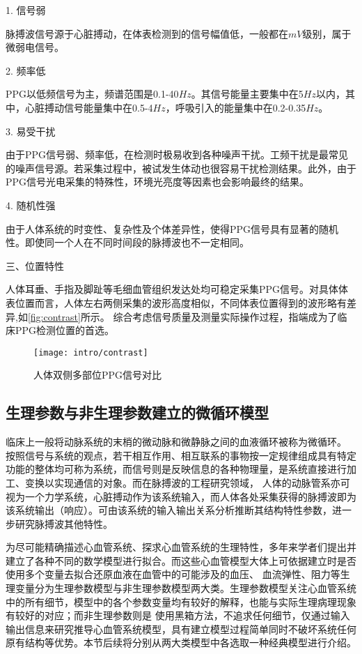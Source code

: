 1. 信号弱

脉搏波信号源于心脏搏动，在体表检测到的信号幅值低，一般都在$mV$级别，属于微弱电信号。

2. 频率低

PPG以低频信号为主，频谱范围是0.1-40$Hz$。其信号能量主要集中在5$Hz$以内，其中，心脏搏动信号能量集中在0.5-4$Hz$，呼吸引入的能量集中在0.2-0.35$Hz$。

3. 易受干扰

由于PPG信号弱、频率低，在检测时极易收到各种噪声干扰。工频干扰是最常见的噪声信号源。若采集过程中，被试发生体动也很容易干扰检测结果。此外，由于PPG信号光电采集的特殊性，环境光亮度等因素也会影响最终的结果。

4. 随机性强

由于人体系统的时变性、复杂性及个体差异性，使得PPG信号具有显著的随机性。即使同一个人在不同时间段的脉搏波也不一定相同。

三、位置特性

人体耳垂、手指及脚趾等毛细血管组织发达处均可稳定采集PPG信号。对具体体表位置而言，人体左右两侧采集的波形高度相似，不同体表位置得到的波形略有差异\cite{Allen2000,Allen2007},如\autoref{fig:contrast}所示。
综合考虑信号质量及测量实际操作过程，指端成为了临床PPG检测位置的首选\cite{cwl}。
\begin{figure}[htbp]
    \centering
    \texttt{[image: intro/contrast]}
    \caption{\label{fig:contrast}人体双侧多部位PPG信号对比}
\end{figure}

\subsection{生理参数与非生理参数建立的微循环模型}
临床上一般将动脉系统的末梢的微动脉和微静脉之间的血液循环被称为微循环\cite{Abraham2011,John2004}。
按照信号与系统的观点，若干相互作用、相互联系的事物按一定规律组成具有特定功能的整体均可称为系统，而信号则是反映信息的各种物理量，是系统直接进行加工、变换以实现通信的对象\cite{Alan2019}。而在脉搏波的工程研究领域，
人体的动脉管系亦可视为一个力学系统，心脏搏动作为该系统输入，而人体各处采集获得的脉搏波即为该系统输出（响应）。可由该系统的输入输出关系分析推断其结构特性参数，进一步研究脉搏波其他特性\cite{PPGYY}。

为尽可能精确描述心血管系统、探求心血管系统的生理特性，多年来学者们提出并建立了各种不同的数学模型进行拟合。而这些心血管模型大体上可依据建立时是否使用多个变量去拟合还原血液在血管中的可能涉及的血压、
血流弹性、阻力等生理变量分为生理参数模型与非生理参数模型两大类。生理参数模型关注心血管系统中的所有细节，模型中的各个参数变量均有较好的解释，也能与实际生理病理现象有较好的对应；而非生理参数则是
使用黑箱方法，不追求任何细节，仅通过输入输出信息来研究推导心血管系统模型，具有建立模型过程简单同时不破坏系统任何原有结构等优势。本节后续将分别从两大类模型中各选取一种经典模型进行介绍。


